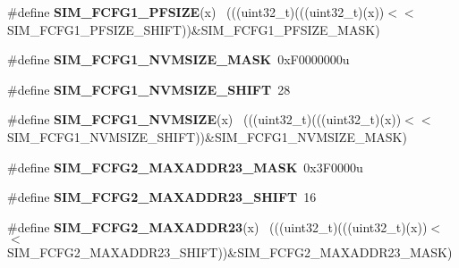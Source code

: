 \begin{DoxyCompactItemize}
\item 
\hypertarget{group___s_i_m___register___masks_ga5d75d9b0aaf8e1b69da9820bf13ec183}{}\#define {\bfseries S\+I\+M\+\_\+\+F\+C\+F\+G1\+\_\+\+P\+F\+S\+I\+Z\+E}(x)                                        ~(((uint32\+\_\+t)(((uint32\+\_\+t)(x))$<$$<$S\+I\+M\+\_\+\+F\+C\+F\+G1\+\_\+\+P\+F\+S\+I\+Z\+E\+\_\+\+S\+H\+I\+F\+T))\&S\+I\+M\+\_\+\+F\+C\+F\+G1\+\_\+\+P\+F\+S\+I\+Z\+E\+\_\+\+M\+A\+S\+K)\label{group___s_i_m___register___masks_ga5d75d9b0aaf8e1b69da9820bf13ec183}

\item 
\hypertarget{group___s_i_m___register___masks_ga048c88e59900fb06533d5cb2003414b7}{}\#define {\bfseries S\+I\+M\+\_\+\+F\+C\+F\+G1\+\_\+\+N\+V\+M\+S\+I\+Z\+E\+\_\+\+M\+A\+S\+K}~0x\+F0000000u\label{group___s_i_m___register___masks_ga048c88e59900fb06533d5cb2003414b7}

\item 
\hypertarget{group___s_i_m___register___masks_ga8ec773a4e814bc88e7ab72da4e32316b}{}\#define {\bfseries S\+I\+M\+\_\+\+F\+C\+F\+G1\+\_\+\+N\+V\+M\+S\+I\+Z\+E\+\_\+\+S\+H\+I\+F\+T}~28\label{group___s_i_m___register___masks_ga8ec773a4e814bc88e7ab72da4e32316b}

\item 
\hypertarget{group___s_i_m___register___masks_ga60cab95310a5dc011d1b64075c2e10f1}{}\#define {\bfseries S\+I\+M\+\_\+\+F\+C\+F\+G1\+\_\+\+N\+V\+M\+S\+I\+Z\+E}(x)                                      ~(((uint32\+\_\+t)(((uint32\+\_\+t)(x))$<$$<$S\+I\+M\+\_\+\+F\+C\+F\+G1\+\_\+\+N\+V\+M\+S\+I\+Z\+E\+\_\+\+S\+H\+I\+F\+T))\&S\+I\+M\+\_\+\+F\+C\+F\+G1\+\_\+\+N\+V\+M\+S\+I\+Z\+E\+\_\+\+M\+A\+S\+K)\label{group___s_i_m___register___masks_ga60cab95310a5dc011d1b64075c2e10f1}

\item 
\hypertarget{group___s_i_m___register___masks_ga64a7cf7594b54a95114688ccff50d693}{}\#define {\bfseries S\+I\+M\+\_\+\+F\+C\+F\+G2\+\_\+\+M\+A\+X\+A\+D\+D\+R23\+\_\+\+M\+A\+S\+K}~0x3\+F0000u\label{group___s_i_m___register___masks_ga64a7cf7594b54a95114688ccff50d693}

\item 
\hypertarget{group___s_i_m___register___masks_ga1579ad2f381bfa82946d3af1acee0221}{}\#define {\bfseries S\+I\+M\+\_\+\+F\+C\+F\+G2\+\_\+\+M\+A\+X\+A\+D\+D\+R23\+\_\+\+S\+H\+I\+F\+T}~16\label{group___s_i_m___register___masks_ga1579ad2f381bfa82946d3af1acee0221}

\item 
\hypertarget{group___s_i_m___register___masks_ga7c7553740129f591dd6cfa0b38b34843}{}\#define {\bfseries S\+I\+M\+\_\+\+F\+C\+F\+G2\+\_\+\+M\+A\+X\+A\+D\+D\+R23}(x)                                  ~(((uint32\+\_\+t)(((uint32\+\_\+t)(x))$<$$<$S\+I\+M\+\_\+\+F\+C\+F\+G2\+\_\+\+M\+A\+X\+A\+D\+D\+R23\+\_\+\+S\+H\+I\+F\+T))\&S\+I\+M\+\_\+\+F\+C\+F\+G2\+\_\+\+M\+A\+X\+A\+D\+D\+R23\+\_\+\+M\+A\+S\+K)\label{group___s_i_m___register___masks_ga7c7553740129f591dd6cfa0b38b34843}


\end{DoxyCompactItemize}
